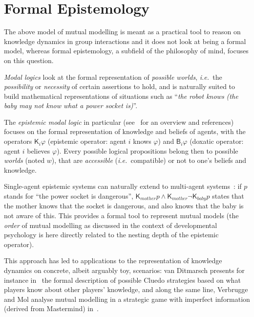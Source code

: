 \documentclass{sig-alternate}
\newcommand{\ie}{{\textit{i.e.~}}}
\begin{document}


\section{Formal Epistemology}
\label{formal-epistemology}

The above model of mutual modelling is meant as a practical tool to reason on
knowledge dynamics in group interactions and it does not look at being a formal
model, whereas formal epistemology, a subfield of the philosophy of mind,
focuses on this question.

\emph{Modal logics} look at the formal representation of \emph{possible
worlds}, \ie the \emph{possibility} or \emph{necessity} of certain assertions
to hold, and is naturally suited to build mathematical representations of
situations such as ``\emph{the robot knows (the baby may not know what a power
socket is)}''.

The \emph{epistemic modal logic} in particular (see~\cite{hendricks2008epistemic} for an
overview and references) focuses on the formal representation of
knowledge and beliefs of agents, with the operators $\mathsf{K}_{i}\varphi$
(epistemic operator: agent $i$ knows $\varphi$) and $\mathsf{B}_{i}\varphi$
(doxatic operator: agent $i$ believes $\varphi$). Every possible logical
propositions belong then to possible \emph{worlds} (noted $w$), that are
\emph{accessible} (\ie compatible) or not to one's beliefs and knowledge.

Single-agent epistemic systems can naturally extend to multi-agent systems~\cite[chapt.
4]{fagin1995reasoning}: if $p$ stands for ``the power socket is dangerous'',
$\mathsf{K}_{mother}p \wedge \mathsf{K}_{mother}\neg\mathsf{K}_{baby}p$ states
that the mother knows that the socket is dangerous, and also knows that the baby
is not aware of this. This provides a formal tool to represent mutual models
(the \emph{order} of mutual modelling as discussed in the context of
developmental psychology is here directly
related to the nesting depth of the epistemic operator).

This approach has led to applications to the representation of knowledge
dynamics on concrete, albeit arguably toy, scenarios: van Ditmarsch presents for
instance in~\cite{ditmarsch2002description} the formal description of possible
Cluedo strategies based on what players know about other players' knowledge, and
along the same line, Verbrugge and Mol analyse mutual modelling in a strategic
game with imperfect information (derived from Mastermind)
in~\cite{verbrugge2008learning}.
\end{document}

